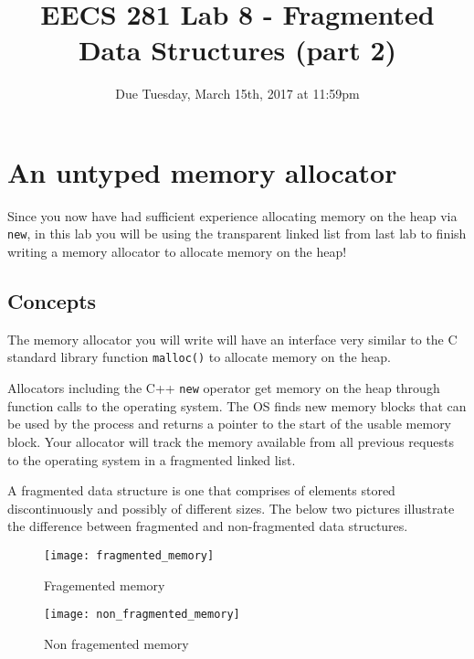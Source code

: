 \documentclass{article}
\begin{document}
\title{\textbf{EECS 281 Lab 8 - Fragmented Data Structures (part 2)}}
\author{Due Tuesday, March 15th, 2017 at 11:59pm}
\date{}
\maketitle
{}
{
   \pagestyle{empty}
}
\thispagestyle{firststyle}

\section{An untyped memory allocator}

Since you now have had sufficient experience allocating memory on the heap via
\texttt{new}, in this lab you will be using the transparent linked list from
last lab to finish writing a memory allocator to allocate memory on the heap!

\subsection{Concepts}
The memory allocator you will write will have an interface very similar to the
C standard library function \texttt{malloc()} to allocate memory on the heap.

Allocators including the C++ \texttt{new} operator get memory on the heap
through function calls to the operating system.  The OS finds new memory
blocks that can be used by the process and returns a pointer to the start of
the usable memory block.  Your allocator will track the memory available from
all previous requests to the operating system in a fragmented linked list.

A fragmented data structure is one that comprises of elements stored
discontinuously and possibly of different sizes.  The below two pictures
illustrate the difference between fragmented and non-fragmented data
structures.

\begin{figure}[!htb]
\centering
\texttt{[image: fragmented\_memory]}
\caption{Fragemented memory}
\end{figure}

\begin{figure}[!htb]
\centering
\texttt{[image: non\_fragmented\_memory]}
\caption{Non fragemented memory}
\end{figure}
\end{document}

